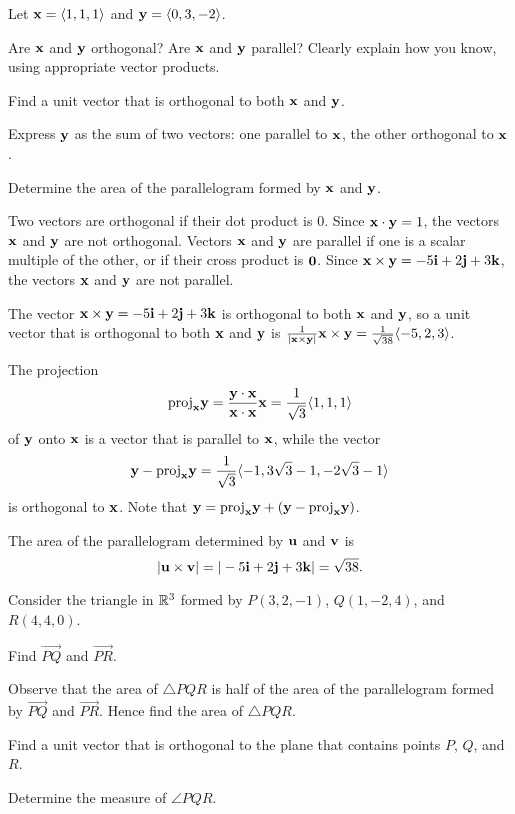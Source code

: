 \begin{exercises}
\item \label{Ez:9.4.2}  Let $\mathbf{x} = \langle 1, 1, 1 \rangle$ and $\mathbf{y} = \langle 0, 3, -2 \rangle$. 

    \ba
    	\item Are $\mathbf{x}$ and $\mathbf{y}$ orthogonal?  Are $\mathbf{x}$ and $\mathbf{y}$ parallel?  Clearly explain how you know, using appropriate vector products.
	\item Find a unit vector that is orthogonal to both $\mathbf{x}$ and $\mathbf{y}$.
	\item Express $\mathbf{y}$ as the sum of two vectors:  one parallel to $\mathbf{x}$, the other orthogonal to $\mathbf{x}$.
	\item Determine the area of the parallelogram formed by $\mathbf{x}$ and $\mathbf{y}$.
    \ea

\begin{exerciseSolution}
  \ba
    \item Two vectors are orthogonal if their dot product is 0. Since $\mathbf{x} \cdot \mathbf{y} = 1$, the vectors $\mathbf{x}$ and $\mathbf{y}$ are not orthogonal. Vectors $\mathbf{x}$ and $\mathbf{y}$ are parallel if one is a scalar multiple of the other, or if their cross product is $\mathbf{0}$. Since $\mathbf{x} \times \mathbf{y} = -5\mathbf{i} + 2\mathbf{j} + 3\mathbf{k}$, the vectors $\mathbf{x}$ and $\mathbf{y}$ are not parallel. 
	\item The vector $\mathbf{x} \times \mathbf{y} = -5\mathbf{i} + 2\mathbf{j} + 3\mathbf{k}$ is orthogonal to both $\mathbf{x}$ and $\mathbf{y}$, so a unit vector that is orthogonal to both $\mathbf{x}$ and $\mathbf{y}$ is $\frac{1}{|\mathbf{x} \times \mathbf{y}|} \mathbf{x} \times \mathbf{y} = \frac{1}{\sqrt{38}}\langle -5, 2, 3\rangle$. 
	\item The projection 
\[\text{proj}_{\mathbf{x}} \mathbf{y} = \frac{\mathbf{y} \cdot \mathbf{x}}{\mathbf{x} \cdot \mathbf{x}} \mathbf{x} = \frac{1}{\sqrt{3}}\langle 1,1,1 \rangle\]
of $\mathbf{y}$ onto $\mathbf{x}$ is a vector that is parallel to $\mathbf{x}$, while the vector 
\[\mathbf{y} - \text{proj}_{\mathbf{x}} \mathbf{y} = \frac{1}{\sqrt{3}}\langle -1, 3\sqrt{3}-1, -2\sqrt{3}-1 \rangle\]
is orthogonal to $\mathbf{x}$. Note that $\mathbf{y} = \text{proj}_{\mathbf{x}} \mathbf{y} + (\mathbf{y} - \text{proj}_{\mathbf{x}} \mathbf{y})$. 
	\item The area of the parallelogram determined by $\mathbf{u}$ and $\mathbf{v}$ is 
	    \[|\mathbf{u} \times \mathbf{v}| = | -5\mathbf{i} + 2\mathbf{j} + 3\mathbf{k}| = \sqrt{38}.\]
    \ea
\end{exerciseSolution}

\item \label{Ez:9.4.3}  Consider the triangle in $\mathbb{R}^3$ formed by $P(3, 2, -1)$, $Q(1, -2, 4)$, and $R(4, 4, 0)$.  

	\ba
		\item Find $\overrightarrow{PQ}$ and $\overrightarrow{PR}$.
		\item Observe that the area of $\triangle PQR$ is half of the area of the parallelogram formed by $\overrightarrow{PQ}$ and $\overrightarrow{PR}$.  Hence find the area of $\triangle PQR$.
		\item Find a unit vector that is orthogonal to the plane that contains points $P$, $Q$, and $R$.
		\item Determine the measure of $\angle PQR$.
	\ea




\end{exercises}
